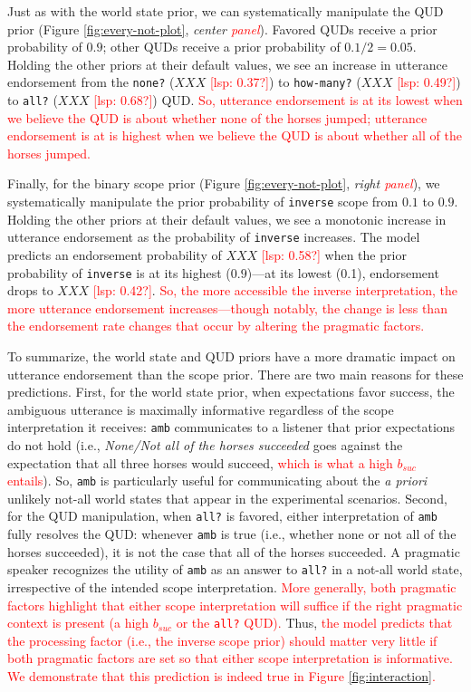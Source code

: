 \documentclass[preprint,authoryear]{elsarticle}\frenchspacing
\newcommand{\lsp}[1]{\textcolor{red}{[lsp: #1]}}
\newcommand{\lp}[1]{\textcolor{red}{#1}} %
\begin{document}
Just as with the world state prior, we can systematically manipulate the QUD prior (Figure \ref{fig:every-not-plot}, \emph{center \lp{panel}}).  Favored QUDs receive a prior probability of $0.9$; other QUDs receive a prior probability of $0.1/2=0.05$. Holding the other priors at their default values, we see an increase in utterance endorsement from the \texttt{none?} ($XXX$ \lsp{0.37?}) to \texttt{how-many?} ($XXX$ \lsp{0.49?}) to \texttt{all?} ($XXX$ \lsp{0.68?}) QUD. %
\lp{So, utterance endorsement is at its lowest when we believe the QUD is about whether none of the horses jumped; utterance endorsement is at is highest when we believe the QUD is about whether all of the horses jumped.}

Finally, for the binary scope prior (Figure \ref{fig:every-not-plot}, \emph{right \lp{panel}}), we systematically manipulate the prior probability of \texttt{inverse} scope from $0.1$ to $0.9$. Holding the other priors at their default values, we see a monotonic increase in utterance endorsement as the probability of \texttt{inverse} increases. The model predicts an endorsement probability of $XXX$ \lsp{0.58?} when the prior probability of \texttt{inverse} is at its highest ($0.9$)---at its lowest (0.1), endorsement drops to $XXX$ \lsp{0.42?}.
\lp{So, the more accessible the inverse interpretation, the more utterance endorsement increases---though notably, the change is less than the endorsement rate changes that occur by altering the pragmatic factors.}

To summarize, the world state and QUD priors have a more dramatic impact on utterance endorsement than the scope prior.  There are two main reasons for these predictions. First, for the world state prior, when expectations favor success, the ambiguous utterance is maximally informative regardless of the scope interpretation it receives: \texttt{amb} communicates to a listener that prior  expectations do not hold (i.e., \textit{None/Not all of the horses succeeded} goes against the expectation that all three horses would succeed, \lp{which is what a high $b_{suc}$ entails}). So, \texttt{amb} is particularly useful for communicating about the \emph{a priori} unlikely not-all world states that appear in the experimental scenarios. Second, for the QUD manipulation, when \texttt{all?} is favored, either interpretation of \texttt{amb} fully resolves the QUD: whenever \texttt{amb} is true (i.e., whether none or not all of the horses succeeded), it is not the case that all of the horses succeeded. A pragmatic speaker recognizes the utility of \texttt{amb} as an answer to \texttt{all?} in a not-all world state, irrespective of the intended scope interpretation.
\lp{More generally, both pragmatic factors highlight that either scope interpretation will suffice if the right pragmatic context is present (a high $b_{suc}$ or the \texttt{all?} QUD).}
Thus, \lp{the model predicts that the processing factor (i.e., the inverse scope prior) should matter very little if both pragmatic factors are set so that either scope interpretation is informative. We demonstrate that this prediction is indeed true in Figure \ref{fig:interaction}.}
\end{document}
